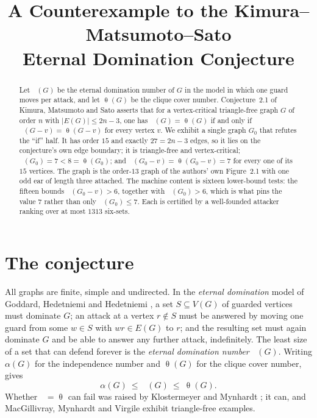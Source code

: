 \documentclass[11pt]{amsart}
\title[A counterexample on eternal domination]
{A Counterexample to the Kimura--Matsumoto--Sato\\ Eternal Domination Conjecture}
\date{}
\theoremstyle{remark}
\DeclareMathOperator{\edom}{\gamma^{\infty}}
\DeclareMathOperator{\thet}{\theta}
\newcommand{\Gz}{G_0}
\begin{document}
\begin{abstract}
Let $\edom(G)$ be the eternal domination number of $G$ in the model in which one guard moves per
attack, and let $\thet(G)$ be the clique cover number. Conjecture~2.1 of Kimura, Matsumoto and
Sato asserts that for a vertex-critical triangle-free graph $G$ of order $n$ with
$|E(G)|\le 2n-3$, one has $\edom(G)=\thet(G)$ if and only if $\edom(G-v)=\thet(G-v)$ for every
vertex $v$. We exhibit a single graph $\Gz$ that refutes the ``if'' half. It has order $15$ and
exactly $27=2n-3$ edges, so it lies on the conjecture's own edge boundary; it is triangle-free
and vertex-critical; $\edom(\Gz)=7<8=\thet(\Gz)$; and $\edom(\Gz-v)=\thet(\Gz-v)=7$ for every one
of its $15$ vertices. The graph is the order-$13$ graph of the authors' own Figure~2.1 with one
odd ear of length three attached. The machine
content is sixteen lower-bound tests: the fifteen bounds $\edom(\Gz-v)>6$, together with
$\edom(\Gz)>6$, which is what pins the value $7$ rather than only $\edom(\Gz)\le 7$. Each is
certified by a well-founded attacker ranking over at most $1313$ six-sets.
\end{abstract}

\maketitle

\section{The conjecture}

All graphs are finite, simple and undirected. In the \emph{eternal domination} model of Goddard,
Hedetniemi and Hedetniemi \cite{GHH}, a set $S\subseteq V(G)$ of guarded vertices must dominate
$G$; an attack at a vertex $r\notin S$ must be answered by moving one guard from some
$w\in S$ with $wr\in E(G)$ to $r$; and the resulting set must again dominate $G$ and be able to
answer any further attack, indefinitely. The least size of a set that can defend forever is the
\emph{eternal domination number} $\edom(G)$. Writing $\alpha(G)$ for the independence number and
$\thet(G)$ for the clique cover number, \cite{GHH} gives
\begin{equation}\label{eq:sandwich}
  \alpha(G)\ \le\ \edom(G)\ \le\ \thet(G).
\end{equation}
Whether $\edom=\thet$ can fail was raised by Klostermeyer and Mynhardt \cite{KM2015}; it can, and
MacGillivray, Mynhardt and Virgile \cite{MMV} exhibit triangle-free examples.
\end{document}
